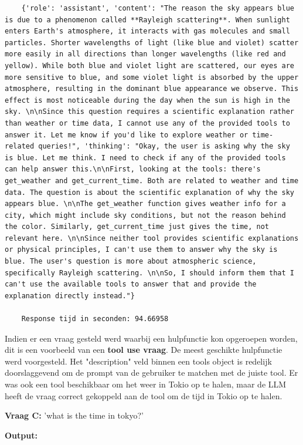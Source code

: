 \begin{verbatim}
    {'role': 'assistant', 'content': "The reason the sky appears blue is due to a phenomenon called **Rayleigh scattering**. When sunlight enters Earth's atmosphere, it interacts with gas molecules and small particles. Shorter wavelengths of light (like blue and violet) scatter more easily in all directions than longer wavelengths (like red and yellow). While both blue and violet light are scattered, our eyes are more sensitive to blue, and some violet light is absorbed by the upper atmosphere, resulting in the dominant blue appearance we observe. This effect is most noticeable during the day when the sun is high in the sky. \n\nSince this question requires a scientific explanation rather than weather or time data, I cannot use any of the provided tools to answer it. Let me know if you'd like to explore weather or time-related queries!", 'thinking': "Okay, the user is asking why the sky is blue. Let me think. I need to check if any of the provided tools can help answer this.\n\nFirst, looking at the tools: there's get_weather and get_current_time. Both are related to weather and time data. The question is about the scientific explanation of why the sky appears blue. \n\nThe get_weather function gives weather info for a city, which might include sky conditions, but not the reason behind the color. Similarly, get_current_time just gives the time, not relevant here. \n\nSince neither tool provides scientific explanations or physical principles, I can't use them to answer why the sky is blue. The user's question is more about atmospheric science, specifically Rayleigh scattering. \n\nSo, I should inform them that I can't use the available tools to answer that and provide the explanation directly instead."}
    
    Response tijd in seconden: 94.66958
\end{verbatim}

Indien er een vraag gesteld werd waarbij een hulpfunctie kon opgeroepen worden, dit is een voorbeeld van een \textbf{tool use vraag}. De meest geschikte hulpfunctie werd voorgesteld. Het "description" veld binnen een tools object is redelijk doorslaggevend om de prompt van de gebruiker te matchen met de juiste tool. Er was ook een tool beschikbaar om het weer in Tokio op te halen, maar de LLM heeft de vraag correct gekoppeld aan de tool om de tijd in Tokio op te halen.

\textbf{Vraag C:} 'what is the time in tokyo?'

\textbf{Output:}

